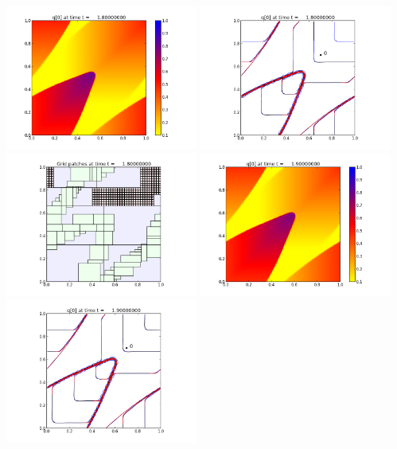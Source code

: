 \documentclass[11pt]{article}
\begin{document}
\vskip 10pt 
\includegraphics[width=0.475\textwidth]{frame0018fig0.png}
\includegraphics[width=0.475\textwidth]{frame0018fig1.png}
\vskip 10pt 
\includegraphics[width=0.475\textwidth]{frame0018fig2.png}
\vskip 10pt 
\includegraphics[width=0.475\textwidth]{frame0019fig0.png}
\includegraphics[width=0.475\textwidth]{frame0019fig1.png}
\end{document}
